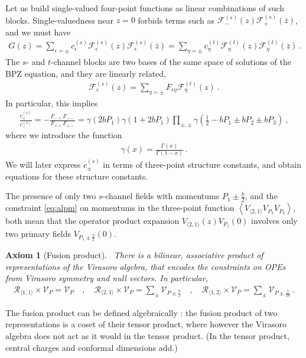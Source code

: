 \documentclass[12pt, a4paper]{article}
\theoremstyle{break}
\newtheorem{hyp}[exo]{Axiom}
\begin{document}
Let us build single-valued four-point functions as linear combinations of such blocks. Single-valuedness near $z=0$ forbids terms such as $\mathcal{F}^{(s)}_{-}(z) \mathcal{F}^{(s)}_{+}(\bar z)$, and we must have 
\begin{align}
 G(z) = \sum_{\epsilon=\pm} c^{(s)}_{\epsilon} \mathcal{F}^{(s)}_{\epsilon}(z) \mathcal{F}^{(s)}_{\epsilon}(\bar z) = \sum_{\eta=\pm} c^{(t)}_{\eta} \mathcal{F}^{(t)}_{\eta}(z) \mathcal{F}^{(t)}_{\eta}(\bar z)\ .
 \label{gz}
\end{align}
The $s$- and $t$-channel blocks are two bases of the same space of solutions of the BPZ equation, and they are linearly related,
\begin{align}
 \mathcal{F}^{(s)}_{\epsilon}(z) = \sum_{\eta=\pm} F_{\epsilon\eta} \mathcal{F}^{(t)}_{\eta}(z)\ .
\end{align}
In particular, this implies 
\begin{align}
 \frac{c_{+}^{(s)}}{c_{-}^{(s)}} = -\frac{F_{-+}F_{--}}{F_{++}F_{+-}} 
 = \gamma(2bP_1)\gamma(1+2bP_1)\prod_{\pm,\pm}\gamma\left(\tfrac12-bP_1\pm bP_2\pm bP_3\right)\ ,
 \label{eq:coc}
\end{align}
where we introduce the function
\begin{align}
 \gamma(x) = \frac{\Gamma(x)}{\Gamma(1-x)}\ .
\label{gx}
\end{align}
We will later express $c_\pm^{(s)}$ in terms of three-point structure constants, and obtain equations for these structure constants.

The presence of only two $s$-channel fields with momentums $P_1\pm \frac{b}{2}$, and the constraint \eqref{eq:alpm} on momentums in the three-point function $\left<V_{\langle 2,1\rangle}V_{P_2}V_{P_3}\right>$, both mean that the operator product expansion $V_{\langle 2, 1 \rangle}(z) V_{P_1}(0)$ involves only two primary fields $V_{P_1\pm \frac{b}{2}}(0)$. 

\begin{hyp}[Fusion product]
 ~\label{hyp:fus}
 There is a bilinear, associative product of representations of the Virasoro algebra, that encodes the constraints on OPEs from Virasoro symmetry and null vectors. In particular,
 \begin{align}
  \mathcal{R}_{\langle 1,1\rangle}\times \mathcal V_P = \mathcal V_P \quad , \quad 
  \mathcal{R}_{\langle 2,1\rangle}\times \mathcal V_P = \sum_\pm \mathcal V_{P\pm \frac{b}{2}}\quad , \quad  
  \mathcal{R}_{\langle 1,2\rangle}\times \mathcal V_P = \sum_\pm \mathcal V_{P\pm \frac{1}{2b}}\ .
  \label{eq:rv}
 \end{align}
\end{hyp}
The fusion product can be defined algebraically \cite{gab99}: the fusion product of two representations is a coset of their tensor product, where however the Virasoro algebra does not act as it would in the tensor product. (In the tensor product, central charges and conformal dimensions add.) 
\end{document}
